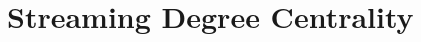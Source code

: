 \documentclass{report}
\newtheorem{theorem}{Theorem}[section]
\newcommand{\algoname}[1]{\textnormal{\textsc{#1}}}
\newcommand{\med}{\mathrm{median}}
\begin{document}
%
%
%
%
%

\section{Streaming Degree Centrality} \label{dc:sec:dc}


\end{document}
